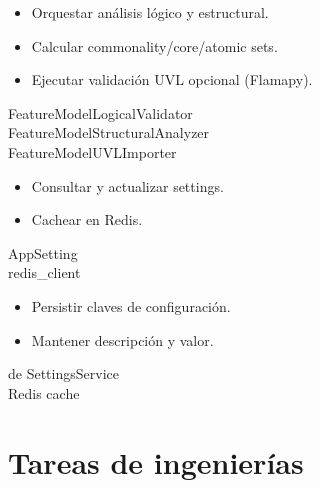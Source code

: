 \begin{addendum}
		\begin{crccard}
			\crcresp
			{
				\begin{itemize}
				\item Orquestar análisis lógico y estructural.
				\item Calcular commonality/core/atomic sets.
				\item Ejecutar validación \ac{UVL} opcional (Flamapy).
				\end{itemize}
			}
			\crccolab
			{
				FeatureModelLogicalValidator\\
				FeatureModelStructuralAnalyzer\\
				FeatureModelUVLImporter
			}
		\end{crccard}

		\begin{crccard}
			\crcresp
			{
				\begin{itemize}
				\item Consultar y actualizar settings.
				\item Cachear en Redis.
				\end{itemize}
			}
			\crccolab
			{
				AppSetting\\
				redis\_client
			}
		\end{crccard}

		\begin{crccard}
			\crcresp
			{
				\begin{itemize}
				\item Persistir claves de configuración.
				\item Mantener descripción y valor.
				\end{itemize}
			}de
			\crccolab
			{
				SettingsService\\
				Redis cache
			}
		\end{crccard}

	\chapter{Tareas de ingenierías}
	\label{anx:ti}

		\begin{engineeringtask}[tb:engtask_t001]
		\end{engineeringtask}


\end{addendum}
